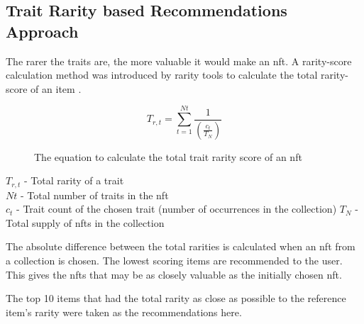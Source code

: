 \documentclass[conference]{IEEEtran}
\begin{document}
\subsection{Trait Rarity based Recommendations Approach}
The rarer the traits are, the more valuable it would make an \gls{nft}. A rarity-score calculation method was introduced by rarity tools to calculate the total rarity-score of an item \autocite{raritytools_introducing_2021}.

\begin{figure}[htbp]
\begin{equation}
T_{r,t} = \sum^{Nt}_{t=1} \frac{1}{\left(\frac{c_{t}}{T_{N}}\right)}
\end{equation}
\caption{The equation to calculate the total trait rarity score of an \gls{nft} \autocite{raritytools_ranking_2021}}
\end{figure}

\noindent$T_{r,t}$ - Total rarity of a trait\\
$Nt$ - Total number of traits in the \gls{nft}\\
$c_{t}$ - Trait count of the chosen trait (number of occurrences in the collection)
$T_{N}$ - Total supply of \gls{nft}s in the collection

The absolute difference between the total rarities is calculated when an \gls{nft} from a collection is chosen. The lowest scoring items are recommended to the user. This gives the \gls{nft}s that may be as closely valuable as the initially chosen \gls{nft}.

The top 10 items that had the total rarity as close as possible to the reference item's rarity were taken as the recommendations here.
\end{document}
